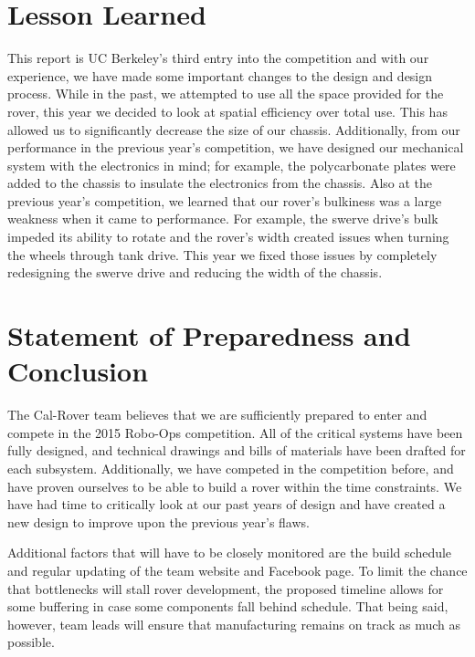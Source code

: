 \documentclass[titlepage,twocolumn,10pt]{article}
\begin{document}
    \section{Lesson Learned}
    This report is UC Berkeley's third entry into the competition and with our experience, we have made some important changes to the design and design process. While in the past, we attempted to use all the space provided for the rover, this year we decided to look at spatial efficiency over total use. This has allowed us to significantly decrease the size of our chassis. Additionally, from our performance in the previous year's competition, we have designed our mechanical system with the electronics in mind; for example, the polycarbonate plates were added to the chassis to insulate the electronics from the chassis. Also at the previous year's competition, we learned that our rover's bulkiness was a large weakness when it came to performance. For example, the swerve drive's bulk impeded its ability to rotate and the rover's width created issues when turning the wheels through tank drive. This year we fixed those issues by completely redesigning the swerve drive and reducing the width of the chassis.

    \section{Statement of Preparedness and Conclusion}
    The Cal-Rover team believes that we are sufficiently prepared to enter and compete in the 2015 Robo-Ops competition. All of the critical systems have been fully designed, and technical drawings and bills of materials have been drafted for each subsystem. Additionally, we have competed in the competition before, and have proven ourselves to be able to build a rover within the time constraints. We have had time to critically look at our past years of design and have created a new design to improve upon the previous year's flaws.

    Additional factors that will have to be closely monitored are the build schedule and regular updating of the team website and Facebook page. To limit the chance that bottlenecks will stall rover development, the proposed timeline allows for some buffering in case some components fall behind schedule. That being said, however, team leads will ensure that manufacturing remains on track as much as possible.
\end{document}

